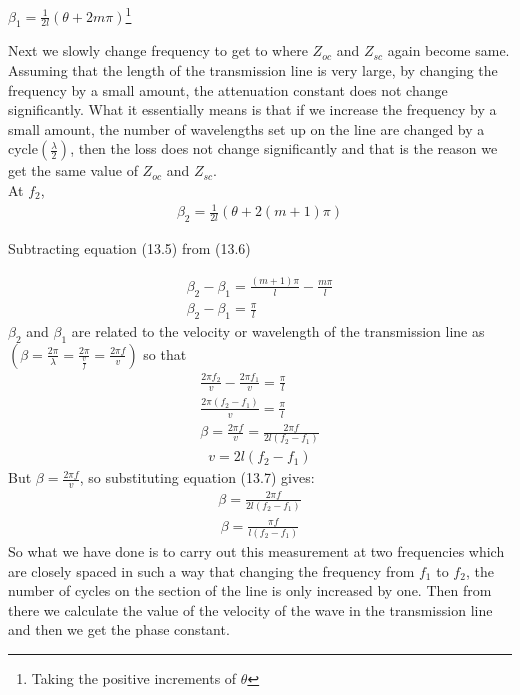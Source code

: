 \begin{center}
$\beta_1= \frac{1}{2l}(\theta + 2m\pi)$\footnote{Taking the positive increments of $\theta$}
\end{center}
Next we slowly change frequency to get to where $Z_{oc}$ and $Z_{sc}$ again become same. Assuming that the length of the transmission line is very large, by changing the frequency by a small amount, the attenuation constant does not change significantly. What it essentially means is that if we increase the frequency by a small amount, the number of wavelengths set up on the line are changed by a cycle$(\frac{\lambda}{2})$, then the loss does not change significantly and that is the reason we get the same value of $Z_{oc}$ and $Z_{sc}$.\\At $f_2$,
\begin{align}
\beta_2 = \frac{1}{2l}(\theta + 2(m + 1)\pi)
\end{align}
\begin{center}
Subtracting equation (13.5) from (13.6)
\end{center}
\begin{align*}
\beta_2 - \beta_1 = \frac{(m + 1)\pi}{l} - \frac{m\pi}{l}\\
\beta_2 - \beta_1 = \frac{\pi}{l}
\end{align*}
$\beta_2$ and $\beta_1$ are related to the velocity or wavelength of the transmission line as $( \beta = \frac{2\pi}{\lambda} = \frac{2\pi}{\frac{v}{f}} = \frac{2\pi f}{v})$ so that
\begin{align*}
\frac{2\pi f_2}{v} - \frac{2\pi f_1}{v} = \frac{\pi}{l}\\
\frac{2\pi(f_2 - f_1)}{v} = \frac{\pi}{l}\\
\beta = \frac{2\pi f}{v} = \frac{2\pi f}{2l(f_2 - f_1)}
\end{align*}
\begin{align}
v = 2l(f_2-f_1)
\end{align}
But $\beta = \frac{2\pi f}{v}$, so substituting equation (13.7) gives:
\begin{align*}
\beta = \frac{2\pi f}{2l(f_2 - f_1)}
\end{align*}
\begin{align}
\beta = \frac{\pi f}{l(f_2 - f_1)}
\end{align}
So what we have done is to carry out this measurement at two frequencies which are closely spaced in such a way that changing the frequency from $f_1$ to $f_2$, the number of cycles on the section of the line is only increased by one. Then from there we calculate the value of the velocity of the wave in the transmission line and then we get the phase constant.

